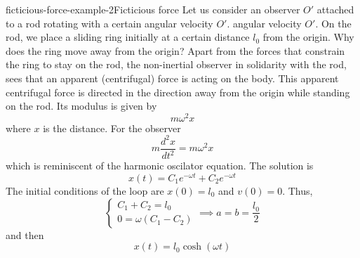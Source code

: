 \documentclass[preview]{standalone}
\begin{document}
\begin{snippetexample}{ficticious-force-example-2}{Ficticious force}
    Let us consider an observer \(O'\) attached to a rod rotating with a certain angular velocity \(O'\).
    angular velocity \(O'\). On the rod, we place a sliding ring initially at a certain distance
    \(l_0\) from the origin.
    Why does the ring move away from the origin?
    Apart from the forces that constrain the ring to stay on the rod, the non-inertial observer
    in solidarity with the rod, sees that an apparent (centrifugal) force is acting on the body.
    This apparent centrifugal force is directed in the direction away from the origin
    while standing on the rod. Its modulus is given by
    \[
        m\omega^2 x
    \]
    where \(x\) is the distance.
    For the observer
    \[
        m \frac{d^2x}{dt^2} = m\omega^2 x
    \]
    which is reminiscent of the harmonic oscilator equation. The solution is
    \[
        x(t) = C_1e^{-\omega t} + C_2e^{-\omega t}
    \]
    The initial conditions of the loop are \(x(0)=l_0\)
    and \(v(0) = 0\).
    Thus,
    \[
        \begin{cases}
            C_1 + C_2 = l_0 \\
            0 = \omega(C_1 - C_2)
        \end{cases}
        \implies a = b = \frac{l_0}{2}
    \]
    and then
    \[
        x(t) = l_0 \cosh(\omega t)
    \]
\end{snippetexample}
\end{document}

